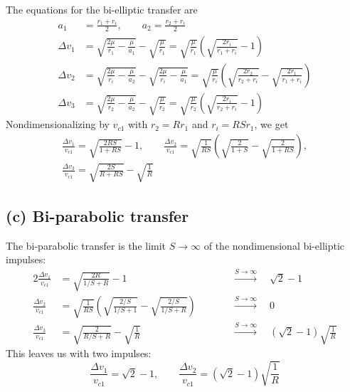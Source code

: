 The equations for the bi-elliptic transfer are
\begin{align*}
a_1 &= \frac{r_1+r_i}{2}, \qquad a_2 = \frac{r_2+r_i}{2}\\[4pt]
\Delta v_1 &= \sqrt{\frac{2\mu}{r_1}-\frac{\mu}{a_1}} - \sqrt{\frac{\mu}{r_1}}
  = \sqrt{\frac{\mu}{r_1}}\left(\sqrt{\frac{2r_i}{r_1+r_i}}-1\right)\\[4pt]
\Delta v_2 &= \sqrt{\frac{2\mu}{r_i}-\frac{\mu}{a_2}} - \sqrt{\frac{2\mu}{r_i}-\frac{\mu}{a_1}}
  = \sqrt{\frac{\mu}{r_i}}\left(\sqrt{\frac{2r_2}{r_2+r_i}}-\sqrt{\frac{2r_1}{r_1+r_i}}\right)\\[4pt]
\Delta v_3 &= \sqrt{\frac{2\mu}{r_2}-\frac{\mu}{a_2}} - \sqrt{\frac{\mu}{r_2}}
  = \sqrt{\frac{\mu}{r_2}}\left(\sqrt{\frac{2r_i}{r_2+r_i}}-1\right)
\end{align*}
Nondimensionalizing by $v_{c1}$ with $r_2 = Rr_1$ and $r_i = RSr_1$, we get
\begin{equation}
\boxed{
\begin{gathered}
\frac{\Delta v_1}{v_{c1}} = \sqrt{\frac{2RS}{1+RS}} - 1, \qquad
\frac{\Delta v_2}{v_{c1}} = \sqrt{\frac{1}{RS}}\left(\sqrt{\frac{2}{1+S}} - \sqrt{\frac{2}{1+RS}}\right), \\[4pt]
\frac{\Delta v_3}{v_{c1}} = \sqrt{\frac{2S}{R+RS}} - \sqrt{\frac{1}{R}}
\end{gathered}}
\label{eq:p1-bielliptic}
\end{equation}

\subsection*{(c) Bi-parabolic transfer}

The bi-parabolic transfer is the limit $S\to\infty$ of the nondimensional bi-elliptic impulses:
\begin{alignat*}{2}
\frac{\Delta v_1}{v_{c1}} &= \sqrt{\frac{2R}{1/S+R}} - 1
  &&\qquad\xrightarrow{S\to\infty}\quad \sqrt{2}-1\\[4pt]
\frac{\Delta v_2}{v_{c1}} &= \sqrt{\frac{1}{RS}}\left(\sqrt{\frac{2/S}{1/S+1}} - \sqrt{\frac{2/S}{1/S+R}}\right)
  &&\qquad\xrightarrow{S\to\infty}\quad 0\\[4pt]
\frac{\Delta v_3}{v_{c1}} &= \sqrt{\frac{2}{R/S+R}} - \sqrt{\frac{1}{R}}
  &&\qquad\xrightarrow{S\to\infty}\quad \left(\sqrt{2}-1\right)\sqrt{\frac{1}{R}}
\end{alignat*}
This leaves us with two impulses:
\begin{equation}
\boxed{\frac{\Delta v_1}{v_{c1}} = \sqrt{2}-1, \qquad \frac{\Delta v_2}{v_{c1}} = \left(\sqrt{2}-1\right)\sqrt{\frac{1}{R}}}
\label{eq:p1-biparabolic}
\end{equation}

